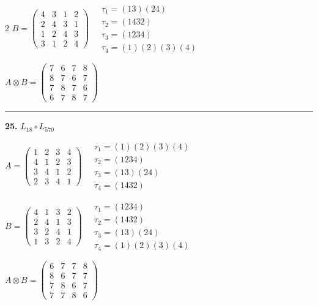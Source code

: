 \begin{multicols}{2}
$B = \begin{pmatrix} 4 & 3 & 1 & 2 \\ 2 & 4 & 3 & 1 \\ 1 & 2 & 4 & 3 \\ 3 & 1 & 2 & 4 \end{pmatrix} \quad \begin{matrix} \tau_{1}=(1 3)(2 4) \\ \tau_{2}=(1 4 3 2) \\ \tau_{3}=(1 2 3 4) \\ \tau_{4}=(1)(2)(3)(4) \end{matrix}$

$A \otimes B = \begin{pmatrix} 7 & 6 & 7 & 8 \\ 8 & 7 & 6 & 7 \\ 7 & 8 & 7 & 6 \\ 6 & 7 & 8 & 7 \end{pmatrix}$

\vspace{0.3em}
\hrule
\vspace{0.3em}

\noindent\textbf{25.} $L_{18} \circ L_{570}$

$A = \begin{pmatrix} 1 & 2 & 3 & 4 \\ 4 & 1 & 2 & 3 \\ 3 & 4 & 1 & 2 \\ 2 & 3 & 4 & 1 \end{pmatrix} \quad \begin{matrix} \tau_{1}=(1)(2)(3)(4) \\ \tau_{2}=(1 2 3 4) \\ \tau_{3}=(1 3)(2 4) \\ \tau_{4}=(1 4 3 2) \end{matrix}$

$B = \begin{pmatrix} 4 & 1 & 3 & 2 \\ 2 & 4 & 1 & 3 \\ 3 & 2 & 4 & 1 \\ 1 & 3 & 2 & 4 \end{pmatrix} \quad \begin{matrix} \tau_{1}=(1 2 3 4) \\ \tau_{2}=(1 4 3 2) \\ \tau_{3}=(1 3)(2 4) \\ \tau_{4}=(1)(2)(3)(4) \end{matrix}$

$A \otimes B = \begin{pmatrix} 6 & 7 & 7 & 8 \\ 8 & 6 & 7 & 7 \\ 7 & 8 & 6 & 7 \\ 7 & 7 & 8 & 6 \end{pmatrix}$


\end{multicols}
